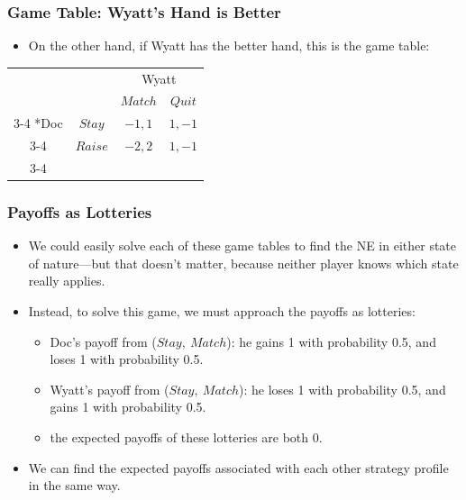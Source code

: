 \begin{frame}
\frametitle{Game Table: Wyatt's Hand is Better}
\begin{itemize}
\item On the other hand, if Wyatt has the better hand, this is the game table:
\end{itemize}
\begin{table}[h]
\centering
 
\begin{tabular}{cc|c|c|}
& \multicolumn{1}{c}{} & \multicolumn{2}{c}{Wyatt}\\
& \multicolumn{1}{c}{} & \multicolumn{1}{c}{$Match$}  & \multicolumn{1}{c}{$Quit$} \\\cline{3-4}
\multirow{2}*{Doc}  & $Stay$ & $-1, 1$ & $1, -1$ \\\cline{3-4}
& $Raise$ & $-2, 2$ & $1,-1$ \\\cline{3-4}
\end{tabular}
\end{table}
\end{frame}


\begin{frame}
\frametitle{Payoffs as Lotteries}
\begin{itemize}
\item We could easily solve each of these game tables to find the NE in either state of nature---but that doesn't matter, because neither player knows which state really applies. 
\item Instead, to solve this game, we must approach the payoffs as lotteries:
\begin{itemize}
\item Doc's payoff from ($Stay,~Match$): he gains 1 with probability 0.5, and loses 1 with probability 0.5.
\item Wyatt's payoff from ($Stay,~Match$): he loses 1 with probability 0.5, and gains 1 with probability 0.5.
\item the expected payoffs of these lotteries are both 0. 
\end{itemize}
\item We can find the expected payoffs associated with each other strategy profile in the same way.
\end{itemize}
\end{frame}


